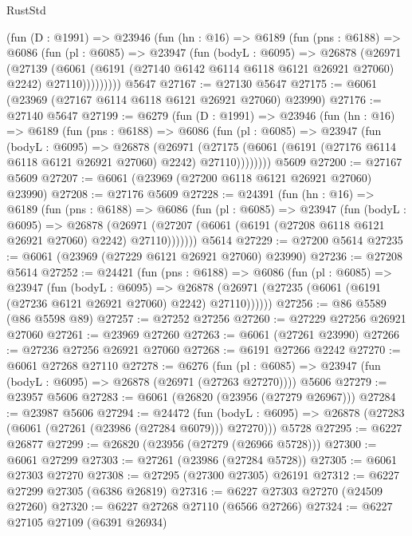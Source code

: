 \begin{lexlean}{RustStd}
\begin{coremodule}
      (fun (D : @1991) =>
      @23946
        (fun (hn : @16) =>
        @6189
          (fun (pns : @6188) =>
          @6086
            (fun (pl : @6085) =>
            @23947
              (fun (bodyL : @6095) =>
              @26878
                (@26971
                  (@27139
                    (@6061
                      (@6191 (@27140 @6142 @6114 @6118 @6121 @26921 @27060) @2242)
                      @27110)))))))))
    @5647
@27167 := @27130 @5647
@27175 := @6061 (@23969 (@27167 @6114 @6118 @6121 @26921 @27060) @23990)
@27176 := @27140 @5647
@27199 := @6279
    (fun (D : @1991) =>
    @23946
      (fun (hn : @16) =>
      @6189
        (fun (pns : @6188) =>
        @6086
          (fun (pl : @6085) =>
          @23947
            (fun (bodyL : @6095) =>
            @26878
              (@26971
                (@27175 (@6061 (@6191 (@27176 @6114 @6118 @6121 @26921 @27060) @2242) @27110))))))))
    @5609
@27200 := @27167 @5609
@27207 := @6061 (@23969 (@27200 @6118 @6121 @26921 @27060) @23990)
@27208 := @27176 @5609
@27228 := @24391
    (fun (hn : @16) =>
    @6189
      (fun (pns : @6188) =>
      @6086
        (fun (pl : @6085) =>
        @23947
          (fun (bodyL : @6095) =>
          @26878
            (@26971 (@27207 (@6061 (@6191 (@27208 @6118 @6121 @26921 @27060) @2242) @27110)))))))
    @5614
@27229 := @27200 @5614
@27235 := @6061 (@23969 (@27229 @6121 @26921 @27060) @23990)
@27236 := @27208 @5614
@27252 := @24421
    (fun (pns : @6188) =>
    @6086
      (fun (pl : @6085) =>
      @23947
        (fun (bodyL : @6095) =>
        @26878 (@26971 (@27235 (@6061 (@6191 (@27236 @6121 @26921 @27060) @2242) @27110))))))
@27256 := @86 @5589 (@86 @5598 @89)
@27257 := @27252 @27256
@27260 := @27229 @27256 @26921 @27060
@27261 := @23969 @27260
@27263 := @6061 (@27261 @23990)
@27266 := @27236 @27256 @26921 @27060
@27268 := @6191 @27266 @2242
@27270 := @6061 @27268 @27110
@27278 := @6276
    (fun (pl : @6085) => @23947 (fun (bodyL : @6095) => @26878 (@26971 (@27263 @27270))))
    @5606
@27279 := @23957 @5606
@27283 := @6061 (@26820 (@23956 (@27279 @26967)))
@27284 := @23987 @5606
@27294 := @24472
    (fun (bodyL : @6095) => @26878 (@27283 (@6061 (@27261 (@23986 (@27284 @6079))) @27270)))
    @5728
@27295 := @6227 @26877
@27299 := @26820 (@23956 (@27279 (@26966 @5728)))
@27300 := @6061 @27299
@27303 := @27261 (@23986 (@27284 @5728))
@27305 := @6061 @27303 @27270
@27308 := @27295 (@27300 @27305) @26191
@27312 := @6227 @27299 @27305 (@6386 @26819)
@27316 := @6227 @27303 @27270 (@24509 @27260)
@27320 := @6227 @27268 @27110 (@6566 @27266)
@27324 := @6227 @27105 @27109 (@6391 @26934)

\end{coremodule}
\end{lexlean}
